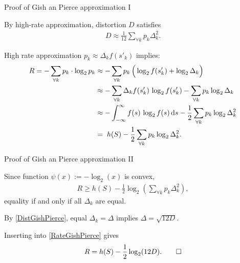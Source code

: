 \begin{frame}{Proof of Gish an Pierce approximation I}
\bit 
\item By high-rate approximation, distortion $D$ satisfies
\begin{align}\label{DistGishPierce}
D\approx \frac{1}{12}\sum_{\forall k}p_k\Delta_k^2.
\end{align}
\item High rate approximation $p_k\approx \Delta_k f(s'_k)$ implies:
\begin{align}\label{RateGishPierce} 
    R =
    -\sum_{\forall k}p_k\cdot\log_2p_k
    &\approx
    -\sum_{\forall k}p_k\,\Big(\log_2f(s'_k)+\log_2\Delta_k\Big)\nonumber
    \\    
    &\approx
    -\sum_{\forall k}\Delta_kf(s'_k)\,\log_2f(s'_k)-\sum_{\forall k}p_k\log_2\Delta_k\nonumber\\
    &\approx
    -\int_{-\infty}^{\infty}f(s)\,\log_2f(s)\,\mathrm{d} s-\frac{1}{2}\sum_{\forall k}p_k\log_2\Delta_k^2 \nonumber
    \\ &=\;
      h(S)-\frac{1}{2}\sum_{\forall k}p_k\log_2\Delta_k^2.
  \end{align}
\eit
\end{frame}
\begin{frame}{Proof of Gish an Pierce approximation II}\bit
\item Since function $\psi(x):=-\log_2(x)$ is convex, 
\begin{align*}
R\geq h(S)-\frac{1}{2}\log_2(\sum_{\forall k}p_k \Delta_k^2),
\end{align*}
equality if and only if all $\Delta_k$ are equal.
\item By \eqref{DistGishPierce}, equal $\Delta_k=\Delta$ implies $\Delta=\sqrt{12D}$.
\item Inserting into \eqref{RateGishPierce} gives
\begin{align}\label{DeltaGishPierce}
R=h(S)-\frac{1}{2}\log_2(12 D). \qed
\end{align}
\eit
\end{frame}







